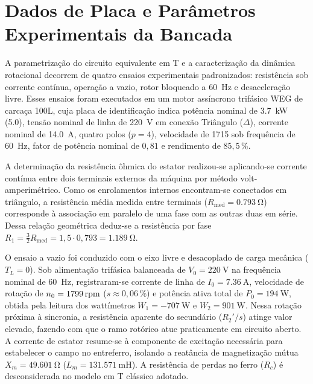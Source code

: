 \section{Dados de Placa e Parâmetros Experimentais da Bancada}\label{sec:parametros_bancada}

A parametrização do circuito equivalente em T e a caracterização da dinâmica rotacional decorrem de quatro ensaios experimentais padronizados: resistência sob corrente contínua, operação a vazio, rotor bloqueado a \SI{60}{\hertz} e desaceleração livre. Esses ensaios foram executados em um motor assíncrono trifásico WEG de carcaça 100L, cuja placa de identificação indica potência nominal de \SI{3,7}{\kilo\watt} (\SI{5,0}{\cv}), tensão nominal de linha de \SI{220}{\volt} em conexão Triângulo ($\Delta$), corrente nominal de \SI{14,0}{\ampere}, quatro polos ($p = 4$), velocidade de \SI{1715}{\RPM} sob frequência de \SI{60}{\hertz}, fator de potência nominal de $0{,}81$ e rendimento de $85{,}5\,\%$.

A determinação da resistência ôhmica do estator realizou-se aplicando-se corrente contínua entre dois terminais externos da máquina por método volt-amperimétrico. Como os enrolamentos internos encontram-se conectados em triângulo, a resistência média medida entre terminais ($R_{\text{med}} = \SI{0,793}{\ohm}$) corresponde à associação em paralelo de uma fase com as outras duas em série. Dessa relação geométrica deduz-se a resistência por fase $R_1 = \frac{3}{2} R_{\text{med}} = 1{,}5 \cdot 0{,}793 = \SI{1,189}{\ohm}$.

O ensaio a vazio foi conduzido com o eixo livre e desacoplado de carga mecânica ($T_L = 0$). Sob alimentação trifásica balanceada de $V_0 = \SI{220}{\volt}$ na frequência nominal de \SI{60}{\hertz}, registraram-se corrente de linha de $I_0 = \SI{7,36}{\ampere}$, velocidade de rotação de $n_0 = \SI{1799}{\mathrm{rpm}}$ ($s \approx 0{,}06\,\%$) e potência ativa total de $P_0 = \SI{194}{\watt}$, obtida pela leitura dos wattímetros $W_1 = \SI{-707}{\watt}$ e $W_2 = \SI{901}{\watt}$. Nessa rotação próxima à sincronia, a resistência aparente do secundário ($R_2'/s$) atinge valor elevado, fazendo com que o ramo rotórico atue praticamente em circuito aberto. A corrente de estator resume-se à componente de excitação necessária para estabelecer o campo no entreferro, isolando a reatância de magnetização mútua $X_m = \SI{49,601}{\ohm}$ ($L_m = \SI{131,571}{\milli\henry}$). A resistência de perdas no ferro ($R_c$) é desconsiderada no modelo em T clássico adotado.

